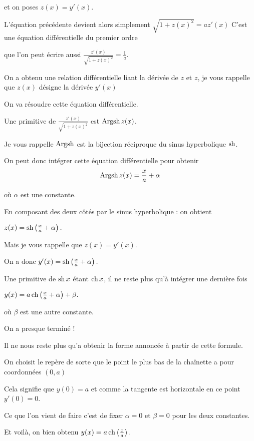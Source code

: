 \change
et on poses $z(x)= y'(x)$.

\change
L'équation précédente devient alors simplement  
$\sqrt{1+z(x)^2} = a z'(x)$
C'est une équation différentielle
du premier ordre

\change
que l'on peut écrire aussi
$\frac{z'(x)}{\sqrt{1+z(x)^2}} = \frac 1 a.$

\diapo


\change
On a obtenu une relation différentielle liant la dérivée de $z$
et $z$, je vous rappelle que $z(x)$ désigne la dérivée $y'(x)$

On va résoudre cette équation différentielle.


\change
Une primitive de $\frac{z'(x)}{\sqrt{1+z(x)^2}}$ est $\mathop{\mathrm{Argsh}}\nolimits z(x)$.

Je vous rappelle $\mathop{\mathrm{Argsh}}\nolimits$ est la bijection réciproque du sinus hyperbolique $\mathop{\mathrm{sh}}\nolimits$.

\change
On peut donc intégrer cette équation différentielle pour obtenir
$$\mathop{\mathrm{Argsh}}\nolimits z(x) = \frac x a + \alpha$$

où $\alpha$ est une constante.

\change
En composant des deux côtés par le sinus hyperbolique :
on obtient 

$z(x) = \mathop{\mathrm{sh}}\nolimits\left(\frac x a + \alpha\right).$

Mais je vous rappelle que $z(x) = y'(x)$.

On a donc $y'(x)= \mathop{\mathrm{sh}}\nolimits\left(\frac x a + \alpha\right).$

\change
Une primitive de $\mathop{\mathrm{sh}}\nolimits x$ étant $\mathop{\mathrm{ch}}\nolimits x$,
il ne reste plus qu'à intégrer une dernière fois 

$y(x) = a \mathop{\mathrm{ch}}\nolimits \left(\frac x a + \alpha\right) + \beta.$

où $\beta$ est une autre constante.




\diapo

On a presque terminé !

\change
Il ne nous reste plus qu'a obtenir la forme annoncée
à partir de cette formule.

\change

\change
On choisit le repère de sorte que le point le plus 
bas de la chaînette 
a pour coordonnées $(0,a)$ 

\change
Cela signifie que $y(0)=a$ et comme la tangente 
est horizontale en ce point $y'(0)=0$. 

\change
Ce que l'on vient de faire c'est de fixer
$\alpha=0$ et $\beta=0$ pour les deux constantes.

\change
Et voilà, on bien obtenu $y(x) = a \mathop{\mathrm{ch}}\nolimits \left(\frac x a\right)$.





